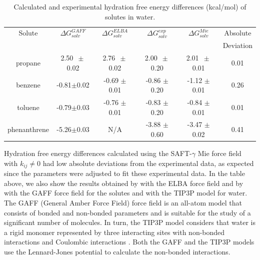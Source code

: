 \begin{table}[H]
	\centering
	\caption{Calculated and experimental hydration free energy differences  (kcal/mol) of solutes in water.}
	\label{tbl:solv2}
	\begin{tabular}{cccccc}
		\hline\hline
		Solute       & $\Delta G_{solv}^{GAFF}$ & $\Delta G_{solv}^{ELBA}$ & $\Delta G_{solv}^{exp}$ & $\Delta G_{solv}^{Mie}$ & Absolute  \\
		&                          &                          &                         &                         & Deviation \\ \hline\hline
		propane      & 2.50 $\, \pm$0.02           & 2.76 $\, \pm$ 0.02          & 2.00 $\, \pm$ 0.20         & 2.01 $ \, \pm$ 0.01         & 0.01      \\
		benzene      & -0.81$\pm$0.02           & -0.69 $\pm$ 0.01         & -0.86 $\pm$ 0.20        & -1.12 $\pm$ 0.01        & 0.26      \\
		toluene      & -0.79$\pm$0.03           & -0.76 $\pm$ 0.01         & -0.83 $\pm$ 0.20        & -0.84 $\pm$ 0.01        & 0.01      \\
		phenanthrene & -5.26$\pm$0.03           & N/A                        & -3.88 $\pm$ 0.60        & -3.47 $\pm$ 0.02        & 0.41      \\ \hline\hline
	\end{tabular}
	
\end{table}

Hydration free energy differences calculated using the SAFT-$\gamma$ Mie force field with $k_{ij} \neq 0$ had low absolute deviations from the experimental data, as expected since the parameters were adjusted to fit these experimental data. In the table above, we also show the results obtained by  with the ELBA force field and by  with the GAFF force field for the solutes and with the TIP3P model for water. The GAFF (General Amber Force Field) force field is an all-atom model that consists of bonded and non-bonded parameters and is suitable for the study of a significant number of molecules. In turn, the TIP3P model considers that water is a rigid monomer represented by three interacting sites with non-bonded interactions and Coulombic interactions \cite{doi:10.1063/1.445869}. Both the GAFF and the TIP3P models use the Lennard-Jones potential to calculate the non-bonded interactions.

